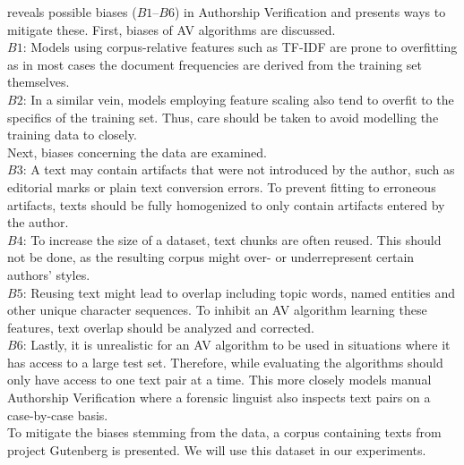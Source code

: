 \cite{stein2019unbiasedGutenbergCorpus} reveals possible biases ($B1$--$B6$) in Authorship Verification and presents ways to mitigate these.
First, biases of AV algorithms are discussed.\\
$B1$: Models using corpus-relative features such as TF-IDF are prone to overfitting as in most cases the document frequencies are derived from the training set themselves.\\
$B2$: In a similar vein, models employing feature scaling also tend to overfit to the specifics of the training set.
Thus, care should be taken to avoid modelling the training data to closely.\\
Next, biases concerning the data are examined.\\
$B3$: A text may contain artifacts that were not introduced by the author, such as editorial marks or plain text conversion errors.
To prevent fitting to erroneous artifacts, texts should be fully homogenized to only contain artifacts entered by the author.\\
$B4$: To increase the size of a dataset, text chunks are often reused.
This should not be done, as the resulting corpus might over- or underrepresent certain authors' styles.\\
$B5$: Reusing text might lead to overlap including topic words, named entities and other unique character sequences.
To inhibit an AV algorithm learning these features, text overlap should be analyzed and corrected.\\
$B6$: Lastly, it is unrealistic for an AV algorithm to be used in situations where it has access to a large test set.
Therefore, while evaluating the algorithms should only have access to one text pair at a time.
This more closely models manual Authorship Verification where a forensic linguist also inspects text pairs on a case-by-case basis.\\
To mitigate the biases stemming from the data, a corpus containing texts from project Gutenberg is presented.
We will use this dataset in our experiments.


